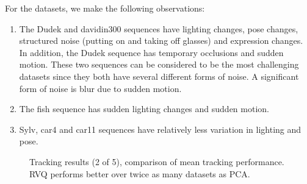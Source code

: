 For the datasets, we make the following observations:

\begin{enumerate}
\item The Dudek and davidin300 sequences have lighting changes, pose changes, structured noise (putting on and taking off glasses) and expression changes.  In addition, the Dudek sequence has temporary occlusions and sudden motion.  These two sequences can be considered to be the most challenging datasets since they both have several different forms of noise.  A significant form of noise is blur due to sudden motion.  
\item The fish sequence has sudden lighting changes and sudden motion.
\item Sylv, car4 and car11 sequences have relatively less variation in lighting and pose.
\end{enumerate}

								\begin{figure}[t]
								\centering
								
								\caption{Tracking results (2 of 5), comparison of mean tracking performance.  RVQ performs better over twice as many datasets as PCA.}
								\label{fig:results_final_2_mean}
								\end{figure}


